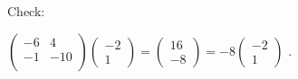 \documentclass[oneside,12pt]{amsart}
\begin{document}
\bigskip

Check:

\bigskip

$
\begin{pmatrix}
-6 & 4 \\
-1 & -10 \\
\end{pmatrix}
\begin{pmatrix}
-2 \\ 1
\end{pmatrix}
=
\begin{pmatrix}
16 \\ -8
\end{pmatrix}
=
-8
\begin{pmatrix}
-2 \\ 1
\end{pmatrix}
$
.

\bigskip
\end{document}
